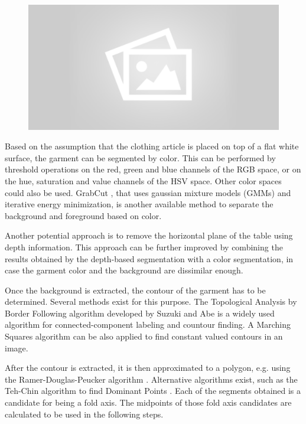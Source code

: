 \begin{figure}[thpb]
    \centering
    \includegraphics[width=0.8
    \textwidth]{figures/placeholder2.png}
    \caption{}
    \label{fig:generic_garment_segmentation}
\end{figure}

Based on the assumption that the clothing article is placed on top of a flat white surface, the garment can be segmented by color. This can be performed by threshold operations on the red, green and blue channels of the RGB space, or on the hue, saturation and value channels of the HSV space. Other color spaces could also be used. GrabCut , that uses gaussian mixture models (GMMs) and iterative energy minimization, is another available method to separate the background and foreground based on color.

Another potential approach is to remove the horizontal plane of the table using depth information. This approach can be further improved by combining the results obtained by the depth-based segmentation with a color segmentation, in case the garment color and the background are dissimilar enough.

Once the background is extracted, the contour of the garment has to be determined. Several methods exist for this purpose. The Topological Analysis by Border Following algorithm developed by Suzuki and Abe  {} is a widely used algorithm for connected-component labeling and countour finding. A Marching Squares  algorithm can be also applied to find constant valued contours in an image.

After the contour is extracted, it is then approximated to a polygon, e.g. using the Ramer-Douglas-Peucker algorithm . Alternative algorithms exist, such as the Teh-Chin algorithm to find Dominant Points  {}. Each of the segments obtained is a candidate for being a fold axis. The midpoints of those fold axis candidates are calculated to be used in the following steps.

